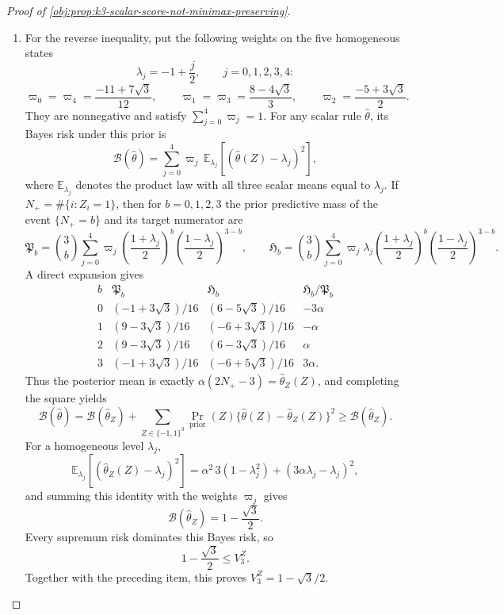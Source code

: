 \documentclass[11pt]{article}
\begin{document}
\begin{proof}[Proof of \cref{obj:prop:k3-scalar-score-not-minimax-preserving}]
\begin{enumerate}
\item
For the reverse inequality, put the following weights on the five homogeneous states
\[
\lambda_j=-1+\frac j2,\qquad j=0,1,2,3,4:
\]
\[
\varpi_0=\varpi_4=\frac{-11+7\sqrt3}{12},\qquad
\varpi_1=\varpi_3=\frac{8-4\sqrt3}{3},\qquad
\varpi_2=\frac{-5+3\sqrt3}{2}.
\]
They are nonnegative and satisfy \(\sum_{j=0}^4\varpi_j=1\). For any scalar rule \(\widehat\theta\), its Bayes risk under this prior is
\[
\mathcal B(\widehat\theta)
=\sum_{j=0}^4\varpi_j\,
\mathbb E_{\lambda_j}\!\left[(\widehat\theta(Z)-\lambda_j)^2\right],
\]
where \(\mathbb E_{\lambda_j}\) denotes the product law with all three scalar means equal to \(\lambda_j\). If \(N_+=\#\{i:Z_i=1\}\), then for \(b=0,1,2,3\) the prior predictive mass of the event \(\{N_+=b\}\) and its target numerator are
\[
\mathfrak P_b
=\binom{3}{b}\sum_{j=0}^4\varpi_j
\left(\frac{1+\lambda_j}{2}\right)^b
\left(\frac{1-\lambda_j}{2}\right)^{3-b},
\qquad
\mathfrak H_b
=\binom{3}{b}\sum_{j=0}^4\varpi_j\lambda_j
\left(\frac{1+\lambda_j}{2}\right)^b
\left(\frac{1-\lambda_j}{2}\right)^{3-b}.
\]
A direct expansion gives
\[
\begin{array}{c|c|c|c}
b&\mathfrak P_b&\mathfrak H_b&\mathfrak H_b/\mathfrak P_b\\ \hline
0&(-1+3\sqrt3)/16&(6-5\sqrt3)/16&-3\alpha\\
1&(9-3\sqrt3)/16&(-6+3\sqrt3)/16&-\alpha\\
2&(9-3\sqrt3)/16&(6-3\sqrt3)/16&\alpha\\
3&(-1+3\sqrt3)/16&(-6+5\sqrt3)/16&3\alpha .
\end{array}
\]
Thus the posterior mean is exactly \(\alpha(2N_+-3)=\widehat\theta_Z(Z)\), and completing the square yields
\[
\mathcal B(\widehat\theta)
=
\mathcal B(\widehat\theta_Z)
+\sum_{Z\in\{-1,1\}^3}
\Pr_{\mathrm{prior}}(Z)
\{\widehat\theta(Z)-\widehat\theta_Z(Z)\}^2
\ge \mathcal B(\widehat\theta_Z).
\]
For a homogeneous level \(\lambda_j\),
\[
\mathbb E_{\lambda_j}\!\left[(\widehat\theta_Z(Z)-\lambda_j)^2\right]
=
\alpha^2\,3(1-\lambda_j^2)+(3\alpha\lambda_j-\lambda_j)^2,
\]
and summing this identity with the weights \(\varpi_j\) gives
\[
\mathcal B(\widehat\theta_Z)=1-\frac{\sqrt3}{2}.
\]
Every supremum risk dominates this Bayes risk, so
\[
1-\frac{\sqrt3}{2}\le V_3^Z .
\]
Together with the preceding item, this proves \(V_3^Z=1-\sqrt3/2\). %


\end{enumerate}
\end{proof}
\end{document}
